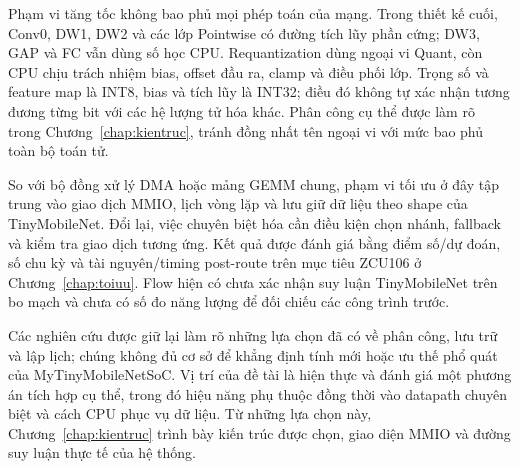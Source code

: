 Phạm vi tăng tốc không bao phủ mọi phép toán của mạng. Trong thiết kế cuối, Conv0, DW1, DW2 và các lớp Pointwise có đường tích lũy phần cứng; DW3, GAP và FC vẫn dùng số học CPU. Requantization dùng ngoại vi Quant, còn CPU chịu trách nhiệm bias, offset đầu ra, clamp và điều phối lớp. Trọng số và feature map là INT8, bias và tích lũy là INT32; điều đó không tự xác nhận tương đương từng bit với các hệ lượng tử hóa khác. Phân công cụ thể được làm rõ trong Chương~\ref{chap:kientruc}, tránh đồng nhất tên ngoại vi với mức bao phủ toàn bộ toán tử.

So với bộ đồng xử lý DMA hoặc mảng GEMM chung, phạm vi tối ưu ở đây tập trung vào giao dịch MMIO, lịch vòng lặp và lưu giữ dữ liệu theo shape của TinyMobileNet. Đổi lại, việc chuyên biệt hóa cần điều kiện chọn nhánh, fallback và kiểm tra giao dịch tương ứng. Kết quả được đánh giá bằng điểm số/dự đoán, số chu kỳ và tài nguyên/timing post-route trên mục tiêu ZCU106 ở Chương~\ref{chap:toiuu}. Flow hiện có chưa xác nhận suy luận TinyMobileNet trên bo mạch và chưa có số đo năng lượng để đối chiếu các công trình trước.

Các nghiên cứu được giữ lại làm rõ những lựa chọn đã có về phân công, lưu trữ và lập lịch; chúng không đủ cơ sở để khẳng định tính mới hoặc ưu thế phổ quát của MyTinyMobileNetSoC. Vị trí của đề tài là hiện thực và đánh giá một phương án tích hợp cụ thể, trong đó hiệu năng phụ thuộc đồng thời vào datapath chuyên biệt và cách CPU phục vụ dữ liệu. Từ những lựa chọn này, Chương~\ref{chap:kientruc} trình bày kiến trúc được chọn, giao diện MMIO và đường suy luận thực tế của hệ thống.
